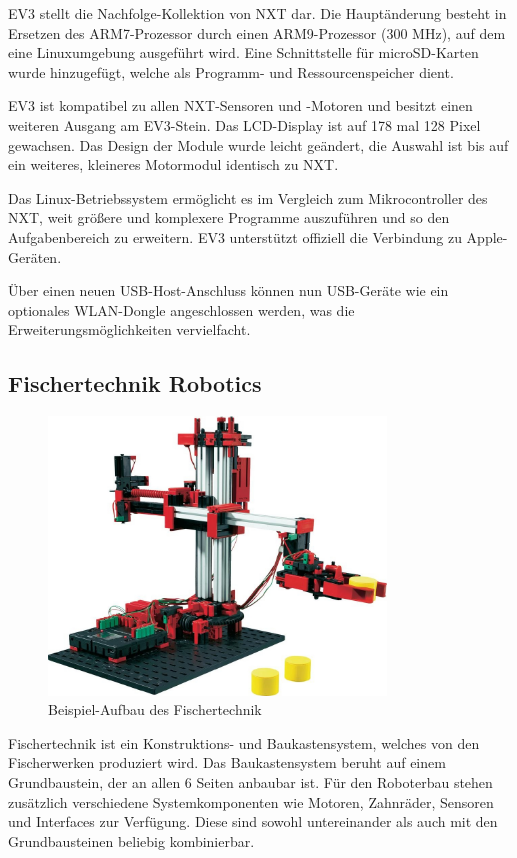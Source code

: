 EV3 stellt die Nachfolge-Kollektion von NXT dar. Die Hauptänderung besteht in Ersetzen des ARM7-Prozessor durch einen ARM9-Prozessor (300 MHz), auf dem eine Linuxumgebung ausgeführt wird. Eine Schnittstelle für microSD-Karten wurde hinzugefügt, welche als Programm- und Ressourcenspeicher dient.

EV3 ist kompatibel zu allen NXT-Sensoren und -Motoren und besitzt einen weiteren Ausgang am EV3-Stein. Das LCD-Display ist auf 178 mal 128 Pixel gewachsen. Das Design der Module wurde leicht geändert, die Auswahl ist bis auf ein weiteres, kleineres Motormodul identisch zu NXT.

Das Linux-Betriebssystem ermöglicht es im Vergleich zum Mikrocontroller des NXT, weit größere und komplexere Programme auszuführen und so den Aufgabenbereich zu erweitern. EV3 unterstützt offiziell die Verbindung zu Apple-Geräten.

Über einen neuen USB-Host-Anschluss können nun USB-Geräte wie ein optionales WLAN-Dongle angeschlossen werden, was die Erweiterungsmöglichkeiten vervielfacht.

\subsection{Fischertechnik Robotics}

\begin{figure}[h]
\centering
\includegraphics[width=0.8\textwidth]{Bilder/MatsAndMets/fischer}
\caption{Beispiel-Aufbau des Fischertechnik}
\label{fig:ev3}
\end{figure}

Fischertechnik ist ein Konstruktions- und Baukastensystem, welches von den Fischerwerken produziert wird. Das Baukastensystem beruht auf einem Grundbaustein, der an allen 6 Seiten anbaubar ist. Für den Roboterbau stehen zusätzlich verschiedene Systemkomponenten wie Motoren, Zahnräder, Sensoren und Interfaces zur Verfügung. Diese sind sowohl untereinander als auch mit den Grundbausteinen beliebig kombinierbar.


